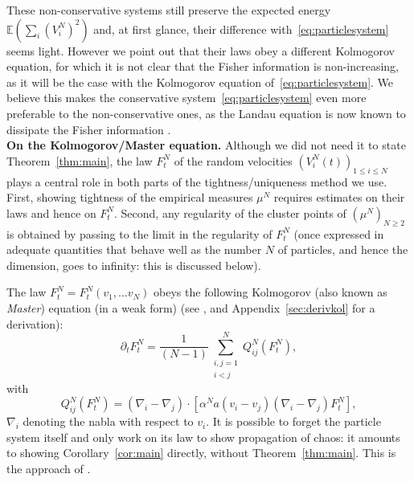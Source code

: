 \documentclass[11pt,a4paper]{article}
\theoremstyle{definition}
\theoremstyle{plain}
\begin{document}
These non-conservative systems still preserve the expected energy $\mathbb{E}(\sum_i (V^N_i)^2)$ and, at first glance, their difference with~\eqref{eq:particlesystem} seems light. However we point out that their laws obey a different Kolmogorov equation, for which it is not clear that the Fisher information is non-increasing, as it will be the case with the Kolmogorov equation of~\eqref{eq:particlesystem}. We believe this makes the conservative system~\eqref{eq:particlesystem} even more preferable to the non-conservative ones, as the Landau equation is now known to dissipate the Fisher information \cite{GuillenSilvestre2023}.
\\

\textbf{On the Kolmogorov/Master equation.}
Although we did not need it to state Theorem~\ref{thm:main}, the law $F^N_t$ of the random velocities $(V^N_i(t))_{1\leq i\leq N}$ plays a central role in both parts of the tightness/uniqueness method we use. First, showing tightness of the empirical measures $\mu^N$ requires estimates on their laws and hence on $F^N_t$. Second, any regularity of the cluster points of $(\mu^N)_{N\geq 2}$ is obtained by passing to the limit in the regularity of $F^N_t$ (once expressed in adequate quantities that behave well as the number $N$ of particles, and hence the dimension, goes to infinity: this is discussed below).

The law $F^N_t=F^N_t(v_1,...v_N)$ obeys the following Kolmogorov (also known as \textit{Master}) equation (in a weak form) (see \cite{Carrapatoso2015,CarrilloGuo2025}, and Appendix~\ref{sec:derivkol} for a derivation):
\begin{equation}
\label{eq:kolintro}
    \partial_t F^N_t =\frac{1}{(N-1)} \sum_{\substack{i, j = 1 \\ i< j}}^N Q^N_{ij}(F^N_t),
\end{equation}
with 
$$Q^N_{ij}(F^N_t)=(\nabla_i - \nabla_j) \cdot \left[ \alpha^N a(v_i - v_j) (\nabla_i - \nabla_j) F^N_t\right],$$
$\nabla_i$ denoting the nabla with respect to $v_i$. It is possible to forget the particle system itself and only work on its law to show propagation of chaos: it amounts to showing Corollary~\ref{cor:main} directly, without Theorem~\ref{thm:main}. This is the approach of \cite{Carrapatoso2015, CarrilloFengGuo2024, CarrilloGuo2025,  MiotPulvirentiSaffirio2011}.
\end{document}
